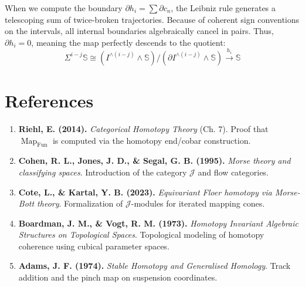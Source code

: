 \documentclass[11pt]{article}
\begin{document}
When we compute the boundary $\partial h_i = \sum \partial c_n$, the Leibniz rule generates a telescoping sum of twice-broken trajectories. Because of coherent sign conventions on the intervals, all internal boundaries algebraically cancel in pairs. Thus, $\partial h_i = 0$, meaning the map perfectly descends to the quotient:
\[ \Sigma^{i-j}\mathbb{S} \cong (I^{\wedge (i-j)} \wedge \mathbb{S}) / (\partial I^{\wedge (i-j)} \wedge \mathbb{S}) \xrightarrow{h_i} \mathbb{S} \]

\section{References}
\begin{enumerate}
    \item \textbf{Riehl, E. (2014).} \textit{Categorical Homotopy Theory} (Ch. 7). Proof that $\operatorname{Map}_{\operatorname{Fun}}$ is computed via the homotopy end/cobar construction.
    \item \textbf{Cohen, R. L., Jones, J. D., \& Segal, G. B. (1995).} \textit{Morse theory and classifying spaces}. Introduction of the category $\mathcal{J}$ and flow categories.
    \item \textbf{Cote, L., \& Kartal, Y. B. (2023).} \textit{Equivariant Floer homotopy via Morse-Bott theory}. Formalization of $\mathcal{J}$-modules for iterated mapping cones.
    \item \textbf{Boardman, J. M., \& Vogt, R. M. (1973).} \textit{Homotopy Invariant Algebraic Structures on Topological Spaces}. Topological modeling of homotopy coherence using cubical parameter spaces.
    \item \textbf{Adams, J. F. (1974).} \textit{Stable Homotopy and Generalised Homology}. Track addition and the pinch map on suspension coordinates.
\end{enumerate}
\end{document}
